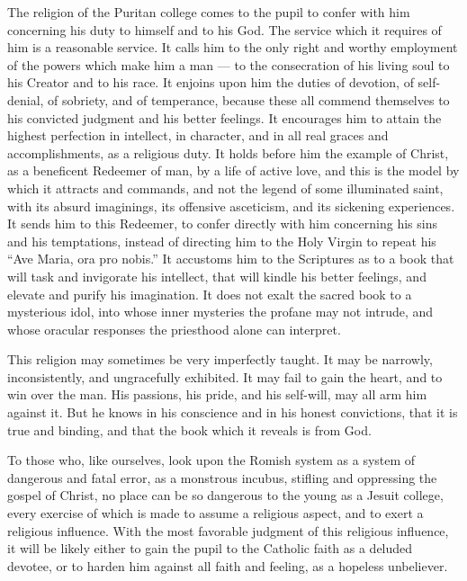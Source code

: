 \documentclass[]{book}
\begin{document}
The religion of the Puritan college comes to the pupil to confer with him concerning his duty to himself and to his God. The service which it requires of him is a reasonable service. It calls him to the only right and worthy employment of the powers which make him a man --- to the consecration of his living soul to his Creator and to his race. It enjoins upon him the duties of devotion, of self-denial, of sobriety, and of temperance, because these all commend themselves to his convicted judgment and his better feelings. It encourages him to attain the highest perfection in intellect, in character, and in all real graces and accomplishments, as a religious duty. It holds before him the example of Christ, as a beneficent Redeemer of man, by a life of active love, and this is the model by which it attracts and commands, and not the legend of some illuminated saint, with its absurd imaginings, its offensive asceticism, and its sickening experiences. It sends him to this Redeemer, to confer directly with him concerning his sins and his temptations, instead of directing him to the Holy Virgin to repeat his ``Ave Maria, ora pro nobis.'' It accustoms him to the Scriptures as to a book that will task and invigorate his intellect, that will kindle his better feelings, and elevate and purify his imagination. It does not exalt the sacred book to a mysterious idol, into whose inner mysteries the profane may not intrude, and whose oracular responses the priesthood alone can interpret.

This religion may sometimes be very imperfectly taught. It may be narrowly, inconsistently, and ungracefully exhibited. It may fail to gain the heart, and to win over the man. His passions, his pride, and his self-will, may all arm him against it. But he knows in his conscience and in his honest convictions, that it is true and binding, and that the book which it reveals is from God.

To those who, like ourselves, look upon the Romish system as a system of dangerous and fatal error, as a monstrous incubus, stifling and oppressing the gospel of Christ, no place can be so dangerous to the young as a Jesuit college, every exercise of which is made to assume a religious aspect, and to exert a religious influence. With the most favorable judgment of this religious influence, it will be likely either to gain the pupil to the Catholic faith as a deluded devotee, or to harden him against all faith and feeling, as a hopeless unbeliever.
\end{document}
